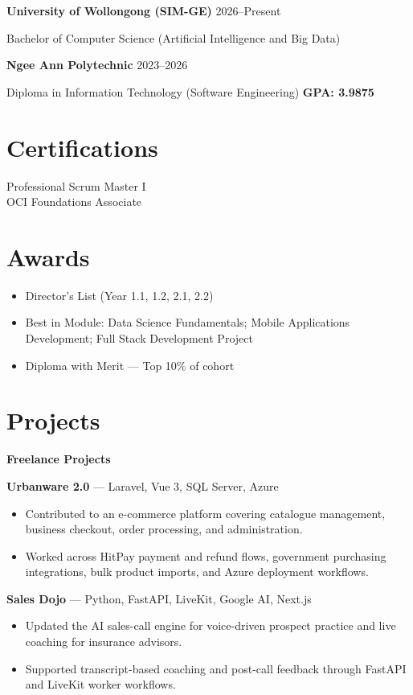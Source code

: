 \documentclass[10pt,a4paper]{article}
\begin{document}
\textbf{University of Wollongong (SIM-GE)}
\hfill
2026--Present
\par

Bachelor of Computer Science (Artificial Intelligence and Big Data)
\par

\textbf{Ngee Ann Polytechnic}
\hfill
2023--2026
\par

Diploma in Information Technology (Software Engineering)
\hfill
\textbf{GPA: 3.9875}

\section*{Certifications}
Professional Scrum Master I \\
OCI Foundations Associate

\section*{Awards}
\begin{itemize}
  \item Director’s List (Year 1.1, 1.2, 2.1, 2.2)
  \item Best in Module: Data Science Fundamentals; Mobile Applications Development; Full Stack Development Project
  \item Diploma with Merit — Top 10\% of cohort
\end{itemize}

\section*{Projects}

\textbf{Freelance Projects}

\textbf{Urbanware 2.0} --- Laravel, Vue 3, SQL Server, Azure
\begin{itemize}
  \item Contributed to an e-commerce platform covering catalogue management, business checkout, order processing, and administration.
  \item Worked across HitPay payment and refund flows, government purchasing integrations, bulk product imports, and Azure deployment workflows.
\end{itemize}

\textbf{Sales Dojo} --- Python, FastAPI, LiveKit, Google AI, Next.js
\begin{itemize}
  \item Updated the AI sales-call engine for voice-driven prospect practice and live coaching for insurance advisors.
  \item Supported transcript-based coaching and post-call feedback through FastAPI and LiveKit worker workflows.
\end{itemize}
\end{document}
